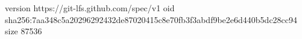 version https://git-lfs.github.com/spec/v1
oid sha256:7aa348c5a20296292432de87020415c8e70fb3f3abdf9be2e6d440b5dc28cc94
size 87536
